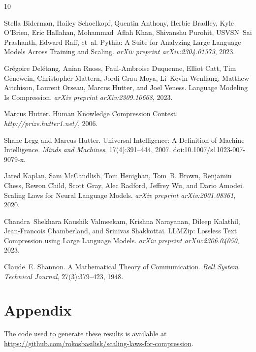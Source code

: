 \documentclass[11pt]{article}
\begin{document}

\begin{thebibliography}{10}

Stella Biderman, Hailey Schoelkopf, Quentin Anthony, Herbie Bradley, Kyle O'Brien, Eric Hallahan, Mohammad~Aflah Khan, Shivanshu Purohit, USVSN~Sai Prashanth, Edward Raff, et~al.
\newblock Pythia: A Suite for Analyzing Large Language Models Across Training and Scaling.
\newblock \emph{arXiv preprint arXiv:2304.01373}, 2023.

Grégoire Delétang, Anian Ruoss, Paul-Ambroise Duquenne, Elliot Catt, Tim Genewein, Christopher Mattern, Jordi Grau-Moya, Li~Kevin Wenliang, Matthew Aitchison, Laurent Orseau, Marcus Hutter, and Joel Veness.
\newblock Language Modeling Is Compression.
\newblock \emph{arXiv preprint arXiv:2309.10668}, 2023.

Marcus Hutter.
\newblock Human Knowledge Compression Contest.
\newblock \emph{http://prize.hutter1.net/}, 2006.

Shane Legg and Marcus Hutter.
\newblock Universal Intelligence: A Definition of Machine Intelligence.
\newblock \emph{Minds and Machines}, 17(4):391--444, 2007.
\newblock doi:10.1007/s11023-007-9079-x.

Jared Kaplan, Sam McCandlish, Tom Henighan, Tom~B. Brown, Benjamin Chess, Rewon Child, Scott Gray, Alec Radford, Jeffrey Wu, and Dario Amodei.
\newblock Scaling Laws for Neural Language Models.
\newblock \emph{arXiv preprint arXiv:2001.08361}, 2020.

Chandra~Shekhara Kaushik Valmeekam, Krishna Narayanan, Dileep Kalathil, Jean-Francois Chamberland, and Srinivas Shakkottai.
\newblock LLMZip: Lossless Text Compression using Large Language Models.
\newblock \emph{arXiv preprint arXiv:2306.04050}, 2023.

Claude~E. Shannon.
\newblock A Mathematical Theory of Communication.
\newblock \emph{Bell System Technical Journal}, 27(3):379--423, 1948.

\end{thebibliography}


\newpage

\appendix

\section{Appendix}
The code used to generate these results is available at \url{https://github.com/rokosbasilisk/scaling-laws-for-compression}.
\label{appendix:experimental_data}
\end{document}
